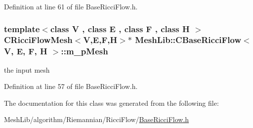 Definition at line 61 of file Base\+Ricci\+Flow.\+h.

\subsubsection[{\texorpdfstring{m\+\_\+p\+Mesh}{m_pMesh}}]{\setlength{\rightskip}{0pt plus 5cm}template$<$class V , class E , class F , class H $>$ C\+Ricci\+Flow\+Mesh$<$V,E,F,H$>$$\ast$ {\bf Mesh\+Lib\+::\+C\+Base\+Ricci\+Flow}$<$ V, E, F, H $>$\+::m\+\_\+p\+Mesh\hspace{0.3cm}{\ttfamily [protected]}}\hypertarget{class_mesh_lib_1_1_c_base_ricci_flow_aad696c079fc6378167052229fcfc2d5c}{}\label{class_mesh_lib_1_1_c_base_ricci_flow_aad696c079fc6378167052229fcfc2d5c}
the input mesh 

Definition at line 57 of file Base\+Ricci\+Flow.\+h.



The documentation for this class was generated from the following file\+:\begin{DoxyCompactItemize}
\item 
Mesh\+Lib/algorithm/\+Riemannian/\+Ricci\+Flow/\hyperlink{_base_ricci_flow_8h}{Base\+Ricci\+Flow.\+h}\end{DoxyCompactItemize}
